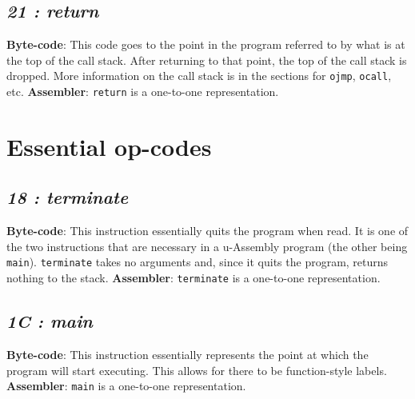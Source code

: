 \documentclass[12pt]{report}
\begin{document}
  \subsection{\emph{21 : return}}
  \textbf{Byte-code}: This code goes to the point in the program referred to by what
  is at the top of the call stack.  After returning to that point, the top of
  the call stack is dropped.  More information on the call stack is in the sections for
  \verb|ojmp|, \verb|ocall|, etc.
  \textbf{Assembler}: \verb|return| is a one-to-one representation.

  \section{Essential op-codes}
  \subsection{\emph{18 : terminate}}
  \textbf{Byte-code}: This instruction essentially quits the program when read.  It
  is one of the two instructions that are necessary in a u-Assembly program (the
  other being \verb|main|).  \verb|terminate| takes no arguments and, since it quits
  the program, returns nothing to the stack.\newline
  \textbf{Assembler}: \verb|terminate| is a one-to-one representation.
  \subsection{\emph{1C : main}}
  \textbf{Byte-code}: This instruction essentially represents the point at which the
  program will start executing.  This allows for there to be function-style labels.
  \newline
  \textbf{Assembler}: \verb|main| is a one-to-one representation.
\end{document}
